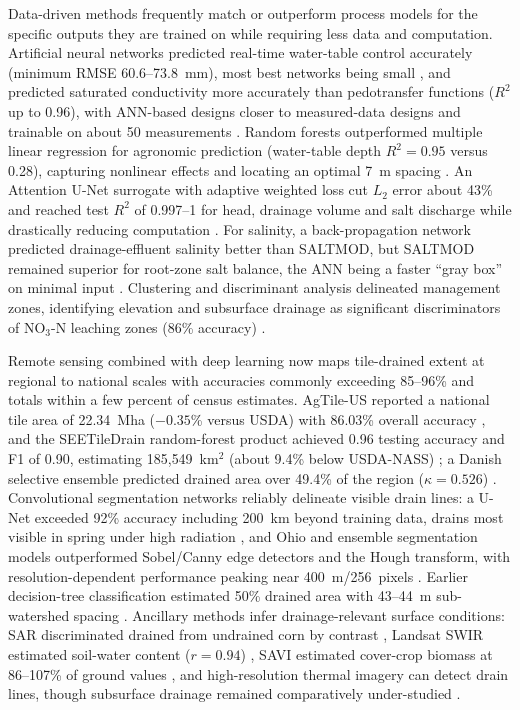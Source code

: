 Data-driven methods frequently match or outperform process models for the specific outputs they are trained on while requiring less data and computation. Artificial neural networks predicted real-time water-table control accurately (minimum RMSE 60.6--73.8~mm), most best networks being small \parencite{Yang2000}, and predicted saturated conductivity more accurately than pedotransfer functions ($R^2$ up to 0.96), with ANN-based designs closer to measured-data designs and trainable on about 50 measurements \parencite{Ellafi2021}. Random forests outperformed multiple linear regression for agronomic prediction (water-table depth $R^2=0.95$ versus 0.28), capturing nonlinear effects and locating an optimal 7~m spacing \parencite{Djiemon2019}. An Attention U-Net surrogate with adaptive weighted loss cut $L_2$ error about 43\% and reached test $R^2$ of 0.997--1 for head, drainage volume and salt discharge while drastically reducing computation \parencite{Lei2026}. For salinity, a back-propagation network predicted drainage-effluent salinity better than SALTMOD, but SALTMOD remained superior for root-zone salt balance, the ANN being a faster ``gray box'' on minimal input \parencite{Sarangi2006}. Clustering and discriminant analysis delineated management zones, identifying elevation and subsurface drainage as significant discriminators of NO$_3$-N leaching zones (86\% accuracy) \parencite{Bakhsh2005b,Bakhsh2007b}.

Remote sensing combined with deep learning now maps tile-drained extent at regional to national scales with accuracies commonly exceeding 85--96\% and totals within a few percent of census estimates. AgTile-US reported a national tile area of 22.34~Mha ($-0.35$\% versus USDA) with 86.03\% overall accuracy \parencite{Valayamkunnath2020}, and the SEETileDrain random-forest product achieved 0.96 testing accuracy and F1 of 0.90, estimating 185{,}549~km$^2$ (about 9.4\% below USDA-NASS) \parencite{Wan2024}; a Danish selective ensemble predicted drained area over 49.4\% of the region ($\kappa=0.526$) \parencite{Moller2018}. Convolutional segmentation networks reliably delineate visible drain lines: a U-Net exceeded 92\% accuracy including 200~km beyond training data, drains most visible in spring under high radiation \parencite{Redoloza2023}, and Ohio and ensemble segmentation models outperformed Sobel/Canny edge detectors and the Hough transform, with resolution-dependent performance peaking near 400~m/256~pixels \parencite{Song2021,Woo2023}. Earlier decision-tree classification estimated 50\% drained area with 43--44~m sub-watershed spacing \parencite{Naz2009}. Ancillary methods infer drainage-relevant surface conditions: SAR discriminated drained from undrained corn by contrast \parencite{Meunier2001}, Landsat SWIR estimated soil-water content ($r=0.94$) \parencite{Rijal2013}, SAVI estimated cover-crop biomass at 86--107\% of ground values \parencite{Xu2018}, and high-resolution thermal imagery can detect drain lines, though subsurface drainage remained comparatively under-studied \parencite{Khanal2020,Zhang2010}.

